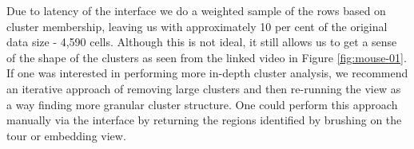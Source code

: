 \documentclass[article,notitle]{jdssv}
\begin{document}
Due to latency of the  interface we do a weighted sample of the rows based on
cluster membership, leaving us with approximately 10 per cent of the original
data size - 4,590 cells. Although this is not ideal, it still allows us to
get a sense of the shape of the clusters as seen from the linked video in Figure \ref{fig:mouse-01}. If one was interested in performing more in-depth cluster analysis, we recommend an iterative approach of removing large clusters and then re-running the  view as a way finding more granular cluster structure. One could perform this approach manually via the  interface by returning the regions identified by brushing on the tour or embedding view.



\begin{figure}


\end{figure}
\end{document}
